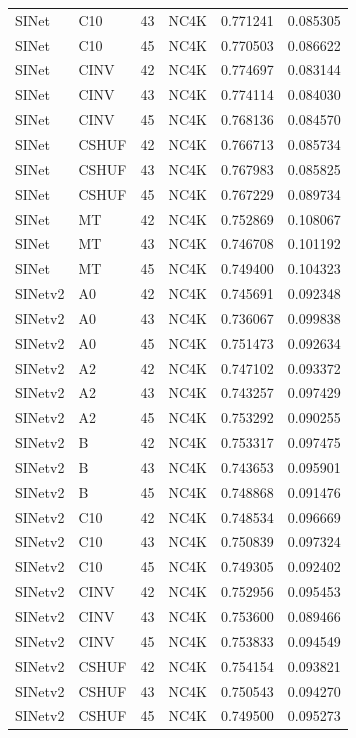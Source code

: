 \begin{table}[h]
\begin{center}
\begin{tabular}{llllcc}
SINet & C10 & 43 & NC4K & 0.771241 & 0.085305 \\
SINet & C10 & 45 & NC4K & 0.770503 & 0.086622 \\
SINet & CINV & 42 & NC4K & 0.774697 & 0.083144 \\
SINet & CINV & 43 & NC4K & 0.774114 & 0.084030 \\
SINet & CINV & 45 & NC4K & 0.768136 & 0.084570 \\
SINet & CSHUF & 42 & NC4K & 0.766713 & 0.085734 \\
SINet & CSHUF & 43 & NC4K & 0.767983 & 0.085825 \\
SINet & CSHUF & 45 & NC4K & 0.767229 & 0.089734 \\
SINet & MT & 42 & NC4K & 0.752869 & 0.108067 \\
SINet & MT & 43 & NC4K & 0.746708 & 0.101192 \\
SINet & MT & 45 & NC4K & 0.749400 & 0.104323 \\
SINetv2 & A0 & 42 & NC4K & 0.745691 & 0.092348 \\
SINetv2 & A0 & 43 & NC4K & 0.736067 & 0.099838 \\
SINetv2 & A0 & 45 & NC4K & 0.751473 & 0.092634 \\
SINetv2 & A2 & 42 & NC4K & 0.747102 & 0.093372 \\
SINetv2 & A2 & 43 & NC4K & 0.743257 & 0.097429 \\
SINetv2 & A2 & 45 & NC4K & 0.753292 & 0.090255 \\
SINetv2 & B & 42 & NC4K & 0.753317 & 0.097475 \\
SINetv2 & B & 43 & NC4K & 0.743653 & 0.095901 \\
SINetv2 & B & 45 & NC4K & 0.748868 & 0.091476 \\
SINetv2 & C10 & 42 & NC4K & 0.748534 & 0.096669 \\
SINetv2 & C10 & 43 & NC4K & 0.750839 & 0.097324 \\
SINetv2 & C10 & 45 & NC4K & 0.749305 & 0.092402 \\
SINetv2 & CINV & 42 & NC4K & 0.752956 & 0.095453 \\
SINetv2 & CINV & 43 & NC4K & 0.753600 & 0.089466 \\
SINetv2 & CINV & 45 & NC4K & 0.753833 & 0.094549 \\
SINetv2 & CSHUF & 42 & NC4K & 0.754154 & 0.093821 \\
SINetv2 & CSHUF & 43 & NC4K & 0.750543 & 0.094270 \\
SINetv2 & CSHUF & 45 & NC4K & 0.749500 & 0.095273 \\
\bottomrule
\end{tabular}
\end{center}
\end{table}
